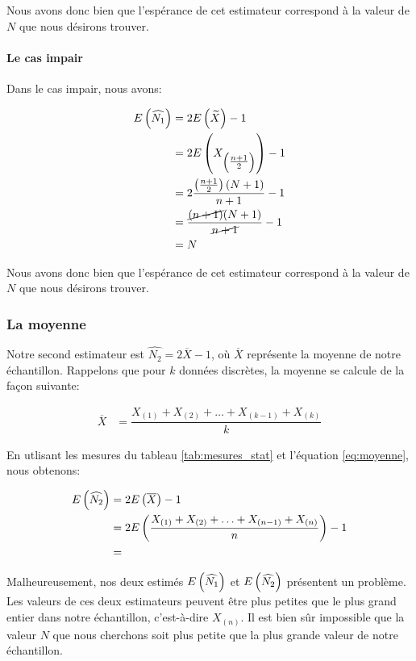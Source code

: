 \documentclass[10pt]{article}
\begin{document}
Nous avons donc bien que l'espérance de cet estimateur correspond à la
valeur de \(N\) que nous désirons trouver.

\paragraph{Le cas impair}\label{le-cas-impair}

Dans le cas impair, nous avons:

\begin{align*}
E\left(\widehat{N_1}\right) &= 2E\left(\widetilde{X}\right)-1 \\
&= 2E\left(X_{\left(\tfrac{n+1}{2}\right)} \right)-1 \\
&= 2\dfrac{\left(\tfrac{n+1}{2}\right)(N+1)}{n+1}-1 \\
&= \dfrac{\cancel{(n+1)}(N+1)}{\cancel{n+1}}-1 \\
&= N
\end{align*}

Nous avons donc bien que l'espérance de cet estimateur correspond à la
valeur de \(N\) que nous désirons trouver.

\subsubsection{La moyenne}\label{la-moyenne}

Notre second estimateur est \(\widehat{N_2}=2\overline{X}-1\), où
\(\overline{X}\) représente la moyenne de notre échantillon. Rappelons
que pour \(k\) données discrètes, la moyenne se calcule de la façon
suivante:

\begin{align}
\overline{X} &= \dfrac{X_{(1)}+X_{(2)}+\ldots +X_{(k-1)}+X_{(k)}}{k}
\label{eq:moyenne}
\end{align}

En utlisant les mesures du tableau \ref{tab:mesures_stat} et l'équation
\ref{eq:moyenne}, nous obtenons:

\begin{align*}
E\left(\widehat{N_2}\right) &= 2E\left(\overline{X}\right)-1 \\
&= 2E\left(\dfrac{X_{(1)}+X_{(2)}+\ldots +X_{(n-1)}+X_{(n)}}{n}\right)-1 \\
&= 
\end{align*}

Malheureusement, nos deux estimés \(E\left(\widehat{N_1}\right)\) et
\(E\left(\widehat{N_2}\right)\) présentent un problème. Les valeurs de ces deux
estimateurs peuvent être plus petites que le plus grand entier dans
notre échantillon, c'est-à-dire \(X_{(n)}\). Il est bien sûr impossible
que la valeur \(N\) que nous cherchons soit plus petite que la plus
grande valeur de notre échantillon.
\end{document}
